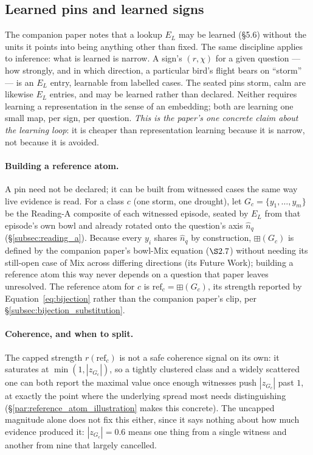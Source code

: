 \documentclass[12pt, a4paper]{article}
\begin{document}
\subsection{Learned pins and learned signs}
\label{subsec:learned_pins}
The companion paper notes that a lookup $E_L$ may be learned
(\S5.6) without the units it points into being anything other than
fixed. The same discipline applies to inference: what is learned is
narrow. A sign's $(r,\chi)$ for a given question --- how strongly, and
in which direction, a particular bird's flight bears on ``storm'' ---
is an $E_L$ entry, learnable from labelled cases. The seated pins
$\mathrm{storm}$, $\mathrm{calm}$ are likewise $E_L$ entries, and may
be learned rather than declared. Neither requires learning a
representation in the sense of an embedding; both are learning one
small map, per sign, per question. \emph{This is the paper's one
concrete claim about the learning loop}: it is cheaper than
representation learning because it is narrow, not because it is
avoided.

\paragraph{Building a reference atom.}
\label{par:reference_atom}
A pin need not be declared; it can be built from witnessed cases the
same way live evidence is read. For a class $c$ (one storm, one
drought), let $G_c=\{y_1,\ldots,y_m\}$ be the Reading-A composite of
each witnessed episode, seated by $E_L$ from that episode's own bowl
and already rotated onto the question's axis $\hat n_q$
(\S\ref{subsec:reading_a}). Because every $y_i$ shares $\hat
n_q$ by construction, $\boxplus(G_c)$ is defined by the
companion paper's bowl-Mix equation ($\S2.7$) without needing its
still-open case of Mix across differing directions (its Future Work);
building a reference atom this way
never depends on a question that paper leaves unresolved. The
reference atom for $c$ is $\mathrm{ref}_c=\boxplus(G_c)$, its strength
reported by Equation~\eqref{eq:bijection} rather than the companion
paper's clip, per \S\ref{subsec:bijection_substitution}.

\paragraph{Coherence, and when to split.}
The capped strength $r(\mathrm{ref}_c)$ is not a safe coherence
signal on its own: it saturates at $\min(1,|z_{G_c}|)$, so a tightly
clustered class and a widely scattered one can both report the
maximal value once enough witnesses push $|z_{G_c}|$ past $1$, at
exactly the point where the underlying spread most needs
distinguishing (\S\ref{par:reference_atom_illustration} makes this
concrete). The uncapped magnitude alone does not fix this either,
since it says nothing about how much evidence produced it: $|z_{G_c}|
= 0.6$ means one thing from a single witness and another from nine
that largely cancelled.
\end{document}
